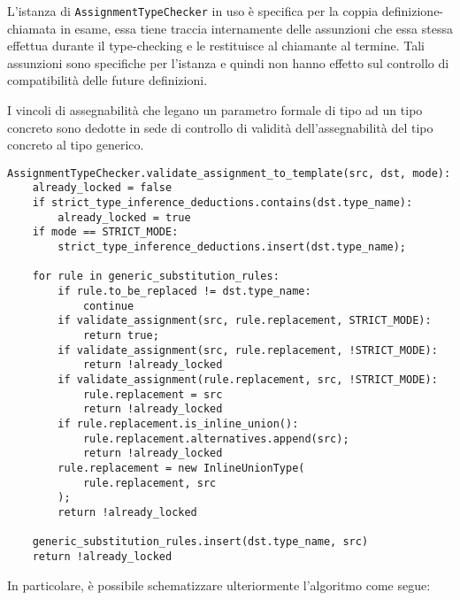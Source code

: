 L'istanza di \texttt{AssignmentTypeChecker} in uso è specifica per la coppia definizione-chiamata in esame,
essa tiene traccia internamente delle assunzioni che essa stessa effettua durante il type-checking e 
le restituisce al chiamante al termine. Tali assunzioni sono specifiche per l'istanza e quindi non hanno 
effetto sul controllo di compatibilità delle future definizioni. \\ 

\newpage

I vincoli di assegnabilità che legano un parametro formale di tipo ad un tipo concreto sono dedotte 
in sede di controllo di validità dell'assegnabilità del tipo concreto al tipo generico. \\

\vspace{0.5cm}
\begin{lstlisting}[frame=single]
AssignmentTypeChecker.validate_assignment_to_template(src, dst, mode):
    already_locked = false
    if strict_type_inference_deductions.contains(dst.type_name):
        already_locked = true
    if mode == STRICT_MODE:
        strict_type_inference_deductions.insert(dst.type_name);

    for rule in generic_substitution_rules:
        if rule.to_be_replaced != dst.type_name:
            continue
        if validate_assignment(src, rule.replacement, STRICT_MODE):   
            return true;
        if validate_assignment(src, rule.replacement, !STRICT_MODE):   
            return !already_locked
        if validate_assignment(rule.replacement, src, !STRICT_MODE):
            rule.replacement = src
            return !already_locked
        if rule.replacement.is_inline_union():
            rule.replacement.alternatives.append(src);
            return !already_locked 
        rule.replacement = new InlineUnionType(
            rule.replacement, src
        );
        return !already_locked

    generic_substitution_rules.insert(dst.type_name, src)
    return !already_locked
\end{lstlisting}
\vspace{0.5cm}

In particolare, è possibile schematizzare ulteriormente l'algoritmo come segue:

